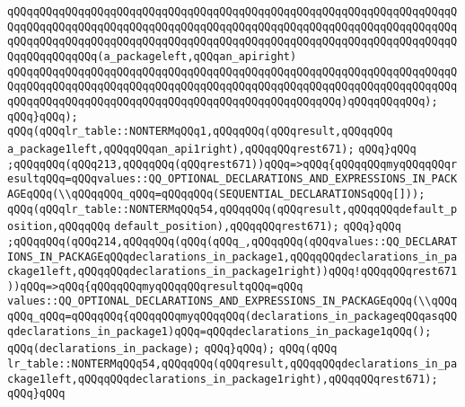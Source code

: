 \verb|qQQqqQQqqQQqqQQqqQQqqQQqqQQqqQQqqQQqqQQqqQQqqQQqqQQqqQQqqQQqqQQqqQQqqQQqqQQqqQQqqQQqqQQqqQQqqQQqqQQqqQQqqQQqqQQqqQQqqQQqqQQqqQQqqQQqqQQqqQQqqQQqqQQqqQQqqQQqqQQqqQQqqQQqqQQqqQQqqQQqqQQqqQQqqQQqqQQqqQQqqQQqqQQqqQQqqQQqqQQqqQQq(a_packageleft,qQQqan_apiright)|\newline
\verb|qQQqqQQqqQQqqQQqqQQqqQQqqQQqqQQqqQQqqQQqqQQqqQQqqQQqqQQqqQQqqQQqqQQqqQQqqQQqqQQqqQQqqQQqqQQqqQQqqQQqqQQqqQQqqQQqqQQqqQQqqQQqqQQqqQQqqQQqqQQqqQQqqQQqqQQqqQQqqQQqqQQqqQQqqQQqqQQqqQQqqQQqqQQqqQQq)qQQqqQQqqQQq);|\newline
\verb|qQQq}qQQq);|\newline
\verb|qQQq(qQQqlr_table::NONTERMqQQq1,qQQqqQQq(qQQqresult,qQQqqQQq|\newline
\verb|a_package1left,qQQqqQQqan_api1right),qQQqqQQqrest671);|\newline
\verb|qQQq}qQQq|\newline
\verb|;qQQqqQQq(qQQq213,qQQqqQQq(qQQqrest671))qQQq=>qQQq{qQQqqQQqmyqQQqqQQqresultqQQq=qQQqvalues::QQ_OPTIONAL_DECLARATIONS_AND_EXPRESSIONS_IN_PACKAGEqQQq(\\qQQqqQQq_qQQq=qQQqqQQq(SEQUENTIAL_DECLARATIONSqQQq[]));|\newline
\verb|qQQq(qQQqlr_table::NONTERMqQQq54,qQQqqQQq(qQQqresult,qQQqqQQqdefault_position,qQQqqQQq|\newline
\verb|default_position),qQQqqQQqrest671);|\newline
\verb|qQQq}qQQq|\newline
\verb|;qQQqqQQq(qQQq214,qQQqqQQq(qQQq(qQQq_,qQQqqQQq(qQQqvalues::QQ_DECLARATIONS_IN_PACKAGEqQQqdeclarations_in_package1,qQQqqQQqdeclarations_in_package1left,qQQqqQQqdeclarations_in_package1right))qQQq!qQQqqQQqrest671))qQQq=>qQQq{qQQqqQQqmyqQQqqQQqresultqQQq=qQQq|\newline
\verb|values::QQ_OPTIONAL_DECLARATIONS_AND_EXPRESSIONS_IN_PACKAGEqQQq(\\qQQqqQQq_qQQq=qQQqqQQq{qQQqqQQqmyqQQqqQQq(declarations_in_packageqQQqasqQQqdeclarations_in_package1)qQQq=qQQqdeclarations_in_package1qQQq();|\newline
\verb|qQQq(declarations_in_package);|\newline
\verb|qQQq}qQQq);|\newline
\verb|qQQq(qQQq|\newline
\verb|lr_table::NONTERMqQQq54,qQQqqQQq(qQQqresult,qQQqqQQqdeclarations_in_package1left,qQQqqQQqdeclarations_in_package1right),qQQqqQQqrest671);|\newline
\verb|qQQq}qQQq|\newline
